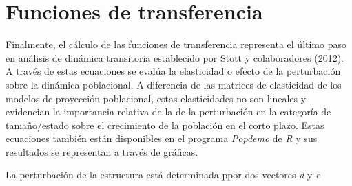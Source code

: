 \documentclass[
]{book}
\theoremstyle{definition}
\theoremstyle{definition}
\theoremstyle{definition}
\theoremstyle{definition}
\theoremstyle{remark}
\begin{document}
\section{Funciones de transferencia}\label{funciones-de-transferencia}

Finalmente, el cálculo de las funciones de transferencia representa el último paso en análisis de dinámica transitoria establecido por Stott y colaboradores (2012). A través de estas ecuaciones se evalúa la elasticidad o efecto de la perturbación sobre la dinámica poblacional. A diferencia de las matrices de elasticidad de los modelos de proyección poblacional, estas elasticidades no son lineales y evidencian la importancia relativa de la de la perturbación en la categoría de tamaño/estado sobre el crecimiento de la población en el corto plazo. Estas ecuaciones también están disponibles en el programa \emph{Popdemo} de \emph{R} y sus resultados se representan a través de gráficas.

La perturbación de la estructura está determinada ppor dos vectores \emph{d} y \emph{e}
\end{document}
